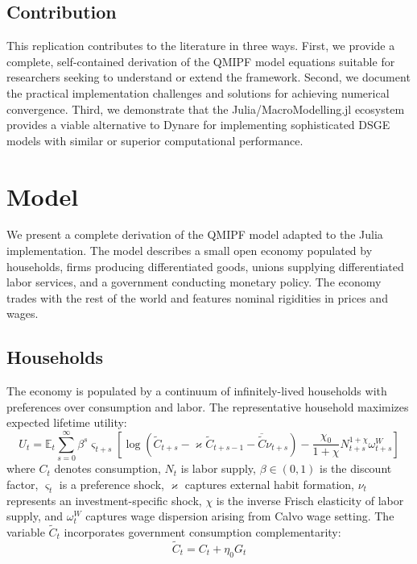 \documentclass[12pt]{article}
\begin{document}
\subsection{Contribution}

This replication contributes to the literature in three ways. First, we provide a complete, self-contained derivation of the QMIPF model equations suitable for researchers seeking to understand or extend the framework. Second, we document the practical implementation challenges and solutions for achieving numerical convergence. Third, we demonstrate that the Julia/MacroModelling.jl ecosystem provides a viable alternative to Dynare for implementing sophisticated DSGE models with similar or superior computational performance.

\section{Model}\label{sec:model}

We present a complete derivation of the QMIPF model adapted to the Julia implementation. The model describes a small open economy populated by households, firms producing differentiated goods, unions supplying differentiated labor services, and a government conducting monetary policy. The economy trades with the rest of the world and features nominal rigidities in prices and wages.

\subsection{Households}

The economy is populated by a continuum of infinitely-lived households with preferences over consumption and labor. The representative household maximizes expected lifetime utility:
\begin{equation}
U_t = \mathbb{E}_t \sum_{s=0}^{\infty} \beta^s \varsigma_{t+s} \left[ \log(\tilde{C}_{t+s} - \varkappa \tilde{C}_{t+s-1} - \overline{\tilde{C}} \nu_{t+s}) - \frac{\chi_0}{1+\chi} N_{t+s}^{1+\chi} \omega_{t+s}^W \right]
\end{equation}
where $C_t$ denotes consumption, $N_t$ is labor supply, $\beta \in (0,1)$ is the discount factor, $\varsigma_t$ is a preference shock, $\varkappa$ captures external habit formation, $\nu_t$ represents an investment-specific shock, $\chi$ is the inverse Frisch elasticity of labor supply, and $\omega_t^W$ captures wage dispersion arising from Calvo wage setting. The variable $\tilde{C}_t$ incorporates government consumption complementarity:
\begin{equation}
\tilde{C}_t = C_t + \eta_0 G_t
\end{equation}
\end{document}
